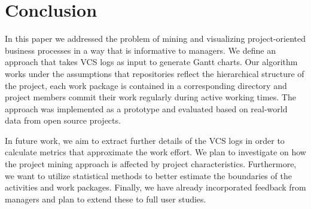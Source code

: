 \section{Conclusion}\label{sec:outro}

In this paper we
addressed the problem of mining and visualizing project-oriented business processes in a way that is informative to managers. We define an approach that takes VCS logs as input to generate Gantt charts.
Our algorithm works under the assumptions that repositories reflect the hierarchical structure of the project, each work package is contained in a corresponding directory and project members commit their work regularly during active working times.
The approach was implemented as a prototype and evaluated based on real-world data from open source projects.

In future work, we aim to extract further details of the VCS logs in order to calculate metrics that approximate the work effort. %
We plan to investigate on how the project mining approach is affected by project characteristics. Furthermore, we want to utilize statistical methods to better estimate the boundaries of the activities and work packages. Finally, we have already incorporated feedback from managers and plan to extend these to full user studies.


